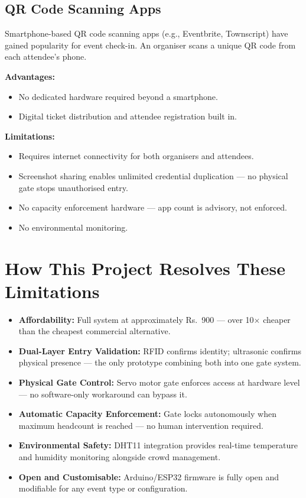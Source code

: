 \documentclass[12pt,a4paper]{report}
\begin{document}
\subsection{QR Code Scanning Apps}

Smartphone-based QR code scanning apps (e.g., Eventbrite, Townscript) have gained popularity for event check-in. An organiser scans a unique QR code from each attendee's phone.

\textbf{Advantages:}
\begin{itemize}[leftmargin=*]
    \item No dedicated hardware required beyond a smartphone.
    \item Digital ticket distribution and attendee registration built in.
\end{itemize}

\textbf{Limitations:}
\begin{itemize}[leftmargin=*]
    \item Requires internet connectivity for both organisers and attendees.
    \item Screenshot sharing enables unlimited credential duplication --- no physical gate stops unauthorised entry.
    \item No capacity enforcement hardware --- app count is advisory, not enforced.
    \item No environmental monitoring.
\end{itemize}

\section{How This Project Resolves These Limitations}

\begin{itemize}[leftmargin=*]
    \item \textbf{Affordability:} Full system at approximately Rs.~900 --- over 10$\times$ cheaper than the cheapest commercial alternative.
    \item \textbf{Dual-Layer Entry Validation:} RFID confirms identity; ultrasonic confirms physical presence --- the only prototype combining both into one gate system.
    \item \textbf{Physical Gate Control:} Servo motor gate enforces access at hardware level --- no software-only workaround can bypass it.
    \item \textbf{Automatic Capacity Enforcement:} Gate locks autonomously when maximum headcount is reached --- no human intervention required.
    \item \textbf{Environmental Safety:} DHT11 integration provides real-time temperature and humidity monitoring alongside crowd management.
    \item \textbf{Open and Customisable:} Arduino/ESP32 firmware is fully open and modifiable for any event type or configuration.
\end{itemize}
\end{document}
